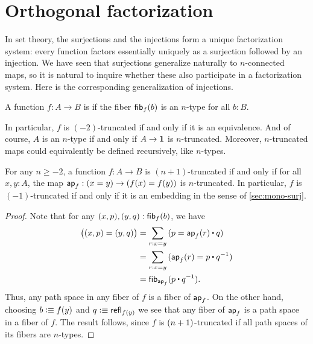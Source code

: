 \section{Orthogonal factorization}
\label{sec:image-factorization}

%
%
In set theory, the surjections and the injections form a unique factorization system: every function factors essentially uniquely as a surjection followed by an injection.
We have seen that surjections generalize naturally to $n$-connected maps, so it is natural to inquire whether these also participate in a factorization system.
Here is the corresponding generalization of injections.

\begin{defn}
  A function $f:A\to B$ is 
if the fiber ${\mathsf{fib}}_{f}(b)$ is an $n$-type for all $b:B$.
\end{defn}

In particular, $f$ is $(-2)$-truncated if and only if it is an equivalence.
And of course, $A$ is an $n$-type if and only if $A\to\mathbf{1}$ is $n$-truncated.
Moreover, $n$-truncated maps could equivalently be defined recursively, like $n$-types.

\begin{lem}\label{thm:modal-mono}
  For any $n\ge -2$, a function $f:A\to B$ is $(n+1)$-truncated if and only if for all $x,y:A$, the map $\mathsf{ap}_{f}:(x=y) \to (f(x)=f(y))$ is $n$-truncated.
  In particular, $f$ is $(-1)$-truncated if and only if it is an embedding in the sense of \autoref{sec:mono-surj}.
\end{lem}
\begin{proof}
  Note that for any $(x,p),(y,q):{\mathsf{fib}}_{f}(b)$, we have
  \begin{align*}
    \big((x,p) = (y,q)\big)
    &= \sm{r:x=y} (p = \apfunc f(r)\ct q)\\
    &= \sm{r:x=y} (\apfunc f (r) = p\ct \opp q)\\
    &= \hfib{\apfunc{f}}{p\ct \opp q}.
  \end{align*}
  Thus, any path space in any fiber of $f$ is a fiber of $\mathsf{ap}_{f}$.
  On the other hand, choosing $b\vcentcolon\equiv f(y)$ and $q\vcentcolon\equiv \mathsf{refl}_{f(y)}$ we see that any fiber of $\mathsf{ap}_{f}$ is a path space in a fiber of $f$.
  The result follows, since $f$ is $(n+1)$-truncated if all path spaces of its fibers are $n$-types.
\end{proof}

